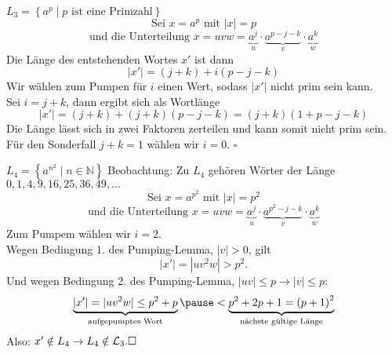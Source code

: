 \documentclass[]{beamer}
\begin{document}
\begin{frame}[squeeze]{}
  \begin{exampleblock}{$L_3 = \left\{a^p \;|\; p \text{ ist eine Primzahl}\right\}$}
    \pause
    \[\text{Sei } x = a^p \text{ mit } |x| = p\]
    \pause
    \[\text{und die Unterteilung } x = uvw = \underbrace{a^j}_u \cdot \underbrace{a^{p-j-k}}_v \cdot \underbrace{a^k}_w\]
    \pause
    Die Länge des entstehenden Wortes $x'$ ist dann
    \[|x'| = (j+k) + i(p-j-k)\]
    \pause
    Wir wählen zum Pumpen für $i$ einen Wert, sodass $|x'|$ nicht prim sein kann. \\
    \pause
    Sei $i = j+k$, dann ergibt sich als Wortlänge
    \[|x'| = (j+k) + (j+k)(p-j-k) = (j+k)(1+p-j-k)\]
    \pause
    Die Länge lässt sich in zwei Faktoren zerteilen und kann somit nicht prim sein.
    \pause
    Für den Sonderfall $j+k=1$ wählen wir $i=0$. \hfill $\square$
  \end{exampleblock}
\end{frame}

\begin{frame}[squeeze]{}
  \begin{exampleblock}{$L_4 = \left\{a^{n^2} \;|\; n \in \mathbb{N}\right\}$}
    Beobachtung: Zu $L_4$ gehören Wörter der Länge $0, 1, 4, 9, 16, 25, 36, 49, \ldots$
    \pause
    \[\text{Sei } x = a^{p^2} \text{ mit } |x| = p^2\]
    \pause
    \vspace*{-1.5em}
    \[\text{und die Unterteilung } x = uvw = \underbrace{a^j}_u \cdot \underbrace{a^{p^2-j-k}}_v \cdot \underbrace{a^k}_w\]
    \pause
    Zum Pumpem wählen wir $i = 2$. \\
    \pause 
    Wegen Bedingung 1. des Pumping-Lemma, $|v| > 0$, gilt
    \pause
    \[|x'| = |uv^2w| > p^2.\]
    \pause
    Und wegen Bedingung 2. des Pumping-Lemma, $|uv| \leq p \to |v| \leq p$:
    \pause
    \[\underbrace{|x'| = |uv^2w| \leq p^2 + p}_{\text{aufgepumptes Wort}} \pause < \underbrace{p^2 + 2p + 1 = \left( p + 1 \right)^2}_\text{nächste gültige Länge} \]
    \pause
    Also: $x' \notin L_4 \to L_4 \notin \mathcal{L}_3. \hfill \square$
  \end{exampleblock}
\end{frame}
\end{document}
